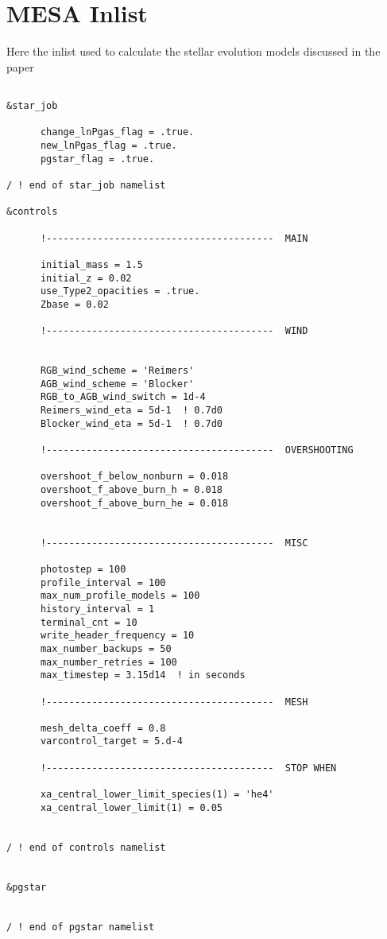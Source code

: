 
\section{MESA Inlist}
\label{inlist}

Here the inlist used to calculate the stellar evolution models discussed in the paper
\begin{verbatim}

&star_job
            
      change_lnPgas_flag = .true.
      new_lnPgas_flag = .true.
      pgstar_flag = .true.

/ ! end of star_job namelist

&controls
      
      !----------------------------------------  MAIN
       
      initial_mass = 1.5
      initial_z = 0.02
      use_Type2_opacities = .true.
      Zbase = 0.02  
      
      !----------------------------------------  WIND


      RGB_wind_scheme = 'Reimers'
      AGB_wind_scheme = 'Blocker'
      RGB_to_AGB_wind_switch = 1d-4
      Reimers_wind_eta = 5d-1  ! 0.7d0
      Blocker_wind_eta = 5d-1  ! 0.7d0 

      !----------------------------------------  OVERSHOOTING

      overshoot_f_below_nonburn = 0.018
      overshoot_f_above_burn_h = 0.018
      overshoot_f_above_burn_he = 0.018


      !----------------------------------------  MISC

      photostep = 100
      profile_interval = 100
      max_num_profile_models = 100
      history_interval = 1
      terminal_cnt = 10
      write_header_frequency = 10
      max_number_backups = 50
      max_number_retries = 100
      max_timestep = 3.15d14  ! in seconds  

      !----------------------------------------  MESH      

      mesh_delta_coeff = 0.8
      varcontrol_target = 5.d-4
      
      !----------------------------------------  STOP WHEN

      xa_central_lower_limit_species(1) = 'he4'
      xa_central_lower_limit(1) = 0.05
      

/ ! end of controls namelist


&pgstar
        

/ ! end of pgstar namelist



\end{verbatim}
